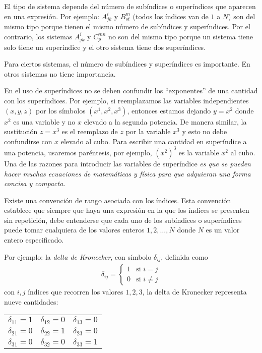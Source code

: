 \par
El tipo de sistema depende del número de subíndices o superíndices que aparecen en una expresión. Por ejemplo: $A_{jk}^{i}$ y $B_{st}^{m}$ (todos los índices van de $1$ a $N$) son del mismo tipo porque tienen el mismo número de subíndices y superíndices. Por el contrario, los sistemas $A_{jk}^{i}$ y $C_{p}^{mn}$ no son del mismo tipo porque un sistema tiene solo tiene un superíndice y el otro sistema tiene dos superíndices.
\par
Para ciertos sistemas, el número de subíndices y superíndices es importante. En otros sistemas no tiene importancia.
\par
En el uso de superíndices no se deben confundir los \enquote{exponentes} de una cantidad con los superíndices. Por ejemplo, si reemplazamos las variables independientes $(x, y, z)$ por los símbolos $(x^{1}, x^{2}, x^{3})$, entonces estamos dejando $y = x^{2}$ donde $x^{2}$ es una variable y no $x$ elevado a la segunda potencia. De manera similar, la sustitución $z = x^{3}$ es el reemplazo de $z$ por la variable $x^{3}$ y esto no debe confundirse con $x$ elevado al cubo. Para escribir una cantidad en superíndice a una potencia, usaremos paréntesis, por ejemplo, $(x^{2})^{3}$ es la variable $x^{2}$ al cubo. Una de las razones para introducir las variables de superíndice \emph{es que se pueden hacer muchas ecuaciones de matemáticas y física para que adquieran una forma concisa y compacta}.
\par
Existe una convención de rango asociada con los índices. Esta convención establece que siempre que haya una expresión en la que los índices se presenten sin repetición, debe entenderse que cada uno de los subíndices o superíndices puede tomar cualquiera de los valores enteros $1, 2, \ldots, N$ donde $N$ es un valor entero especificado.
\par
Por ejemplo: la \emph{delta de Kronecker}, con símbolo $\delta_{ij}$, definida como
\begin{align*}
\delta_{ij} = \begin{cases}
1 & \mbox{si } i = j \\[0.5em]
0 & \mbox{si } i \neq j
\end{cases}
\end{align*}
con $i, j$ índices que recorren los valores $1, 2, 3$, la delta de Kronecker representa nueve cantidades:
\begin{table}[H]
\large
\centering
\begin{tabular}{c c c}
$\delta_{11} = 1$ & $\delta_{12} = 0$ & $\delta_{13} = 0$ \\
$\delta_{21} = 0$ & $\delta_{22} = 1$ & $\delta_{23} = 0$ \\
$\delta_{31} = 0$ & $\delta_{32} = 0$ & $\delta_{33} = 1$
\end{tabular}
\end{table}
